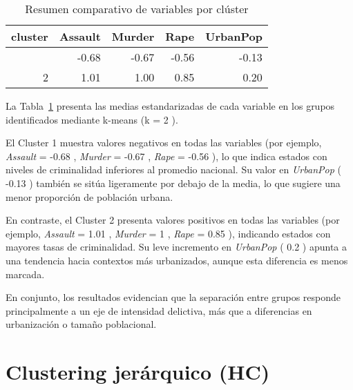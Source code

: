 \documentclass[
  spanish,
  11pt,
  a4paper,
  DIV=11,
  numbers=noendperiod]{scrartcl}
\begin{document}
\begin{longtable}[]{@{}rrrrr@{}}

\caption{\label{tbl-clust-summary}Resumen comparativo de variables por
clúster}

\tabularnewline

\toprule\noalign{}
cluster & Assault & Murder & Rape & UrbanPop \\
\midrule\noalign{}
\endhead
\bottomrule\noalign{}
\endlastfoot
1 & -0.68 & -0.67 & -0.56 & -0.13 \\
2 & 1.01 & 1.00 & 0.85 & 0.20 \\

\end{longtable}

La Tabla~\ref{tbl-clust-summary} presenta las medias estandarizadas de
cada variable en los grupos identificados mediante k-means (k = 2 ).

El Cluster 1 muestra valores negativos en todas las variables (por
ejemplo, \emph{Assault} = -0.68 , \emph{Murder} = -0.67 , \emph{Rape} =
-0.56 ), lo que indica estados con niveles de criminalidad inferiores al
promedio nacional. Su valor en \emph{UrbanPop} ( -0.13 ) también se
sitúa ligeramente por debajo de la media, lo que sugiere una menor
proporción de población urbana.

En contraste, el Cluster 2 presenta valores positivos en todas las
variables (por ejemplo, \emph{Assault} = 1.01 , \emph{Murder} = 1 ,
\emph{Rape} = 0.85 ), indicando estados con mayores tasas de
criminalidad. Su leve incremento en \emph{UrbanPop} ( 0.2 ) apunta a una
tendencia hacia contextos más urbanizados, aunque esta diferencia es
menos marcada.

En conjunto, los resultados evidencian que la separación entre grupos
responde principalmente a un eje de intensidad delictiva, más que a
diferencias en urbanización o tamaño poblacional.

\section{Clustering jerárquico (HC)}\label{clustering-jeruxe1rquico-hc}
\end{document}
